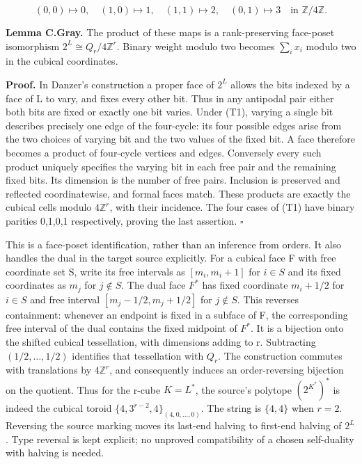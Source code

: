 \[
(0,0)\mapsto0,\quad(1,0)\mapsto1,\quad(1,1)\mapsto2,\quad(0,1)\mapsto3
\quad\text{in }\mathbb Z/4\mathbb Z.
\tag{T1}
\]

\textbf{Lemma C.Gray.} The product of these maps is a rank-preserving
face-poset isomorphism \(2^L\cong Q_r/4\mathbb Z^r\). Binary weight
modulo two becomes \(\sum_i x_i\) modulo two in the cubical
coordinates.

\textbf{Proof.} In Danzer's construction a proper face of \(2^L\) allows
the bits indexed by a face of L to vary, and fixes every other bit. Thus
in any antipodal pair either both bits are fixed or exactly one bit
varies. Under (T1), varying a single bit describes precisely one edge of
the four-cycle: its four possible edges arise from the two choices of
varying bit and the two values of the fixed bit. A face therefore
becomes a product of four-cycle vertices and edges. Conversely every
such product uniquely specifies the varying bit in each free pair and
the remaining fixed bits. Its dimension is the number of free pairs.
Inclusion is preserved and reflected coordinatewise, and formal faces
match. These products are exactly the cubical cells modulo
\(4\mathbb Z^r\), with their incidence. The four cases of (T1) have
binary parities 0,1,0,1 respectively, proving the last assertion.
\(\square\)

This is a face-poset identification, rather than an inference from
orders. It also handles the dual in the target source explicitly. For a
cubical face F with free coordinate set S, write its free intervals as
\([m_i,m_i+1]\) for \(i\in S\) and its fixed coordinates as \(m_j\) for
\(j\notin S\). The dual face \(F^*\) has fixed coordinate \(m_i+1/2\) for
\(i\in S\) and free interval \([m_j-1/2,m_j+1/2]\) for \(j\notin S\).
This reverses containment: whenever an endpoint is fixed in a subface of
F, the corresponding free interval of the dual contains the fixed
midpoint of \(F^*\). It is a bijection onto the shifted cubical
tessellation, with dimensions adding to r. Subtracting
\((1/2,\ldots ,1/2)\) identifies that tessellation with \(Q_r\). The
construction commutes with translations by \(4\mathbb Z^r\), and
consequently induces an order-reversing bijection on the quotient. Thus
for the r-cube \(K=L^*\), the source's polytope \((2^{K^*})^*\) is
indeed the cubical toroid \(\{4,3^{r-2},4\}_{(4,0,\ldots,0)}\). The
string is \(\{4,4\}\) when \(r=2\). Reversing the source marking moves its
last-end halving to first-end halving of \(2^L\). Type reversal is kept
explicit; no unproved compatibility of a chosen self-duality with
halving is needed.

